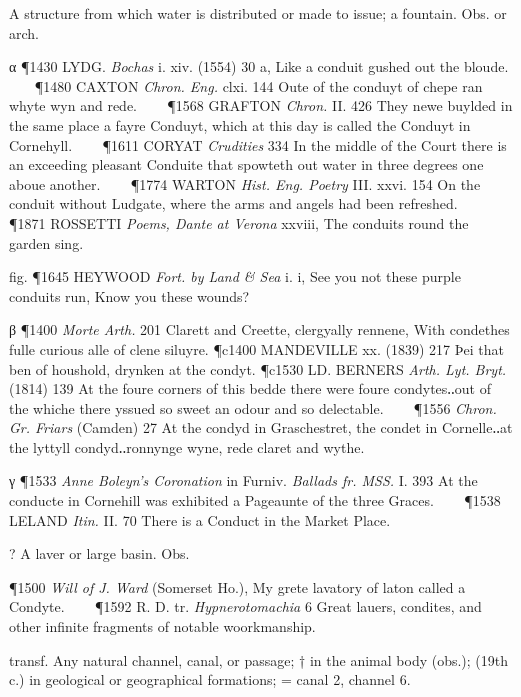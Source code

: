 \begin{description}[wide, labelwidth=!, labelindent=0pt]
\begin{myenumerate}
  A structure from which water is distributed or made to issue; a fountain. Obs. or arch.

\noindent α \P 1430 LYDG.  \textit{Bochas} i. xiv. (1554) 30 a, Like a conduit gushed out the bloude.    
\P 1480 CAXTON  \textit{Chron. Eng.} clxi. 144 Oute of the conduyt of chepe ran whyte wyn and rede.    
\P 1568 GRAFTON  \textit{Chron.} II. 426 They newe buylded in the same place a fayre Conduyt, which at this day is called the Conduyt in Cornehyll.    
\P 1611 CORYAT  \textit{Crudities} 334 In the middle of the Court there is an exceeding pleasant Conduite that spowteth out water in three degrees one aboue another.    
\P 1774 WARTON  \textit{Hist. Eng. Poetry} III. xxvi. 154 On the conduit without Ludgate, where the arms and angels had been refreshed.    
\P 1871 ROSSETTI  \textit{Poems, Dante at Verona} xxviii, The conduits round the garden sing.

fig. \P 1645 HEYWOOD  \textit{Fort. by Land \& Sea} i. i, See you not these purple conduits run, Know you these wounds?

\noindent β \P 1400 \textit{Morte  Arth.} 201 Clarett and Creette, clergyally rennene, With condethes fulle curious alle of clene siluyre.
\P c1400 MANDEVILLE  xx. (1839) 217 Þei that ben of houshold, drynken at the condyt.
\P c1530 LD. BERNERS  \textit{Arth. Lyt. Bryt.} (1814) 139 At the foure corners of this bedde there were foure condytes‥out of the whiche there yssued so sweet an odour and so delectable.    
\P 1556 \textit{Chron.  Gr. Friars} (Camden) 27 At the condyd in Graschestret, the condet in Cornelle‥at the lyttyll condyd‥ronnynge wyne, rede claret and wythe.

\noindent γ \P 1533 \textit{Anne  Boleyn's Coronation} in Furniv. \textit{Ballads fr. MSS.} I. 393 At the conducte in Cornehill was exhibited a Pageaunte of the three Graces.    
\P 1538 LELAND  \textit{Itin.} II. 70 There is a Conduct in the Market Place.

 ? A laver or large basin. Obs.

\P 1500 \textit{Will  of J. Ward} (Somerset Ho.), My grete lavatory of laton called a Condyte.    
\P 1592 R. D. tr.  \textit{Hypnerotomachia} 6 Great lauers, condites, and other infinite fragments of notable woorkmanship.

 transf. Any natural channel, canal, or passage; † in the animal body (obs.);  (19th c.) in geological or geographical formations; = canal 2, channel 6.


\end{myenumerate}
\end{description}
